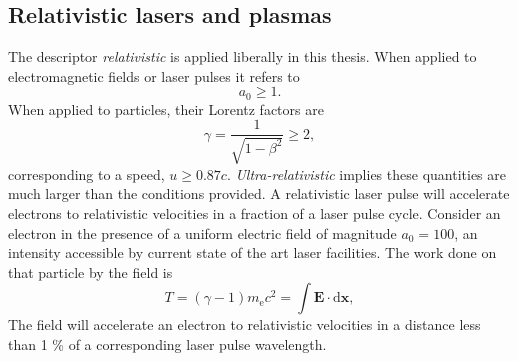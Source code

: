 \subsection{Relativistic lasers and plasmas}
The descriptor \textit{relativistic} is applied liberally in this thesis. When applied to electromagnetic fields or laser pulses it refers to 
\begin{equation}
	a_0 \ge 1.
\end{equation}
When applied to particles, their Lorentz factors are
\begin{equation}
	\gamma = \frac{1}{\sqrt{1-\beta^2}} \ge 2,
\end{equation}
corresponding to a speed, $u \ge 0.87 c$. \textit{Ultra-relativistic} implies these quantities are much larger than the conditions provided. A relativistic laser pulse will accelerate electrons to relativistic velocities in a fraction of a laser pulse cycle. Consider an electron in the presence of a uniform electric field of magnitude $a_0 = 100$, an intensity accessible by current state of the art laser facilities. The work done on that particle by the field is 
\begin{equation}
	T = (\gamma -1)m_\mathrm{e}c^2 = \int \mathbf{E}\cdot \mathrm{d} \mathbf{x},
\end{equation}
The field will accelerate an electron to relativistic velocities in a distance less than 1 \% of a corresponding laser pulse wavelength.

